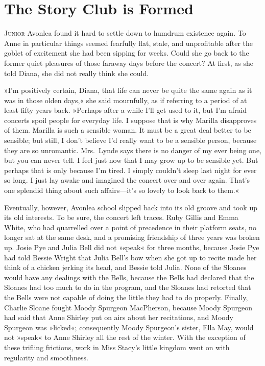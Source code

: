 \chapter{The Story Club is Formed}

\lettrine[lines=4]{J}{unior} Avonlea found it hard to settle down to humdrum existence again. To Anne in particular things seemed fearfully flat, stale, and unprofitable after the goblet of excitement she had been sipping for weeks. Could she go back to the former quiet pleasures of those faraway days before the concert? At first, as she told Diana, she did not really think she could.

»I'm positively certain, Diana, that life can never be quite the same again as it was in those olden days,« she said mournfully, as if referring to a period of at least fifty years back. »Perhaps after a while I'll get used to it, but I'm afraid concerts spoil people for everyday life. I suppose that is why Marilla disapproves of them. Marilla is such a sensible woman. It must be a great deal better to be sensible; but still, I don't believe I'd really want to be a sensible person, because they are so unromantic. Mrs.~Lynde says there is no danger of my ever being one, but you can never tell. I feel just now that I may grow up to be sensible yet. But perhaps that is only because I'm tired. I simply couldn't sleep last night for ever so long. I just lay awake and imagined the concert over and over again. That's one splendid thing about such affairs—it's so lovely to look back to them.«

Eventually, however, Avonlea school slipped back into its old groove and took up its old interests. To be sure, the concert left traces. Ruby Gillis and Emma White, who had quarrelled over a point of precedence in their platform seats, no longer sat at the same desk, and a promising friendship of three years was broken up. Josie Pye and Julia Bell did not »speak« for three months, because Josie Pye had told Bessie Wright that Julia Bell's bow when she got up to recite made her think of a chicken jerking its head, and Bessie told Julia. None of the Sloanes would have any dealings with the Bells, because the Bells had declared that the Sloanes had too much to do in the program, and the Sloanes had retorted that the Bells were not capable of doing the little they had to do properly. Finally, Charlie Sloane fought Moody Spurgeon MacPherson, because Moody Spurgeon had said that Anne Shirley put on airs about her recitations, and Moody Spurgeon was »licked«; consequently Moody Spurgeon's sister, Ella May, would not »speak« to Anne Shirley all the rest of the winter. With the exception of these trifling frictions, work in Miss Stacy's little kingdom went on with regularity and smoothness.

